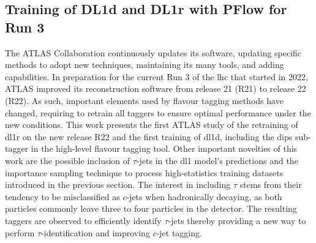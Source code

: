 \subsection{Training of DL1d and DL1r with PFlow for Run 3}
The ATLAS Collaboration continuously updates its software, updating specific methods to adopt new techniques, maintaining its many tools, and adding capabilities. In preparation for the current Run 3 of the \gls{lhc} that started in 2022, ATLAS improved its reconstruction software from release 21 (R21) to release 22 (R22). As such, important elements used by flavour tagging methods have changed, requiring to retrain all taggers to ensure optimal performance under the new conditions. This work presents the first ATLAS study of the retraining of \gls{dl1r} on the new release R22 and the first training of \gls{dl1d}, including the \gls{dips} sub-tagger in the high-level flavour tagging tool. Other important novelties of this work are the possible inclusion of $\tau$-jets in the \gls{dl1} model's predictions and the importance sampling technique to process high-statistics training datasets introduced in the previous section. The interest in including $\tau$ stems from their tendency to be misclassified as $c$-jets when hadronically decaying, as both particles commonly leave three to four particles in the detector. The resulting taggers are observed to efficiently identify $\tau$-jets thereby providing a new way to perform $\tau$-identification and improving $c$-jet tagging.\\ %


